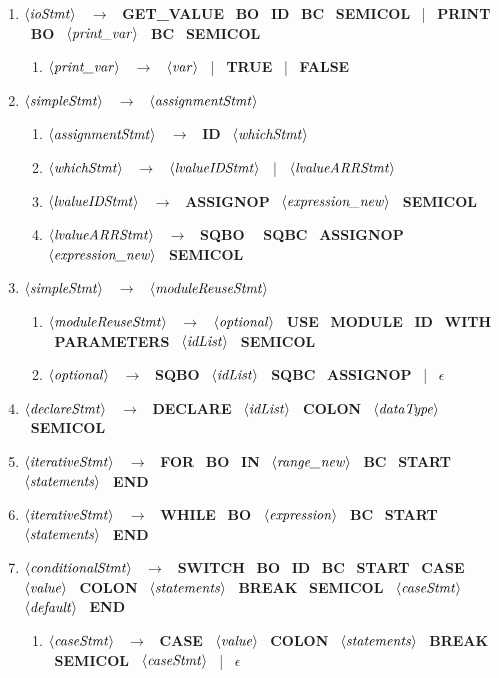 \documentclass[a4paper]{article}
\newcommand{\nonTerm}[1]{$\left<\text{\textit{#1}}\right>$ \ }
\newcommand{\terminal}[1]{\textbf{\uppercase{#1}} \ }
\newcommand{\ra}[0]{$\rightarrow$ \ }
\newcommand{\eps}[0]{\terminal{$\epsilon$}}
\newcommand{\vertbar}[0]{| \ }
\newcommand{\dataType}[0]{\nonTerm{dataType}}
\newcommand{\statements}[0]{\nonTerm{statements}}
\newcommand{\ioStmt}[0]{\nonTerm{ioStmt}}
\newcommand{\printvar}[0]{\nonTerm{print\_var}}
\newcommand{\simpleStmt}[0]{\nonTerm{simpleStmt}}
\newcommand{\declareStmt}[0]{\nonTerm{declareStmt}}
\newcommand{\conditionalStmt}[0]{\nonTerm{conditionalStmt}}
\newcommand{\iterativeStmt}[0]{\nonTerm{iterativeStmt}}
\newcommand{\var}[0]{\nonTerm{var}}
\newcommand{\assignmentStmt}[0]{\nonTerm{assignmentStmt}}
\newcommand{\moduleReuseStmt}[0]{\nonTerm{moduleReuseStmt}}
\newcommand{\whichStmt}[0]{\nonTerm{whichStmt}}
\newcommand{\lvalueIDStmt}[0]{\nonTerm{lvalueIDStmt}}
\newcommand{\lvalueARRStmt}[0]{\nonTerm{lvalueARRStmt}}
\newcommand{\expression}[0]{\nonTerm{expression}}
\newcommand{\expressionNew}[0]{\nonTerm{expression\_new}}
\newcommand{\rangeNew}[0]{\nonTerm{range\_new}}
\newcommand{\optional}[0]{\nonTerm{optional}}
\newcommand{\idList}[0]{\nonTerm{idList}}
\newcommand{\caseStmt}[0]{\nonTerm{caseStmt}}
\newcommand{\valueTerm}[0]{\nonTerm{value}}
\newcommand{\default}[0]{\nonTerm{default}}
\newcommand{\id}[0]{\terminal{id}}
\newcommand{\moduleTerm}[0]{\terminal{module}}
\newcommand{\start}[0]{\terminal{start}}
\renewcommand{\endTerm}[0]{\terminal{end}}
\newcommand{\declare}[0]{\terminal{declare}}
\newcommand{\getvalue}[0]{\terminal{get\_value}}
\newcommand{\print}[0]{\terminal{print}}
\newcommand{\use}[0]{\terminal{use}}
\newcommand{\with}[0]{\terminal{with}}
\newcommand{\true}[0]{\terminal{true}}
\newcommand{\false}[0]{\terminal{false}}
\newcommand{\for}[0]{\terminal{for}}
\newcommand{\inTerm}[0]{\terminal{in}}
\newcommand{\switch}[0]{\terminal{switch}}
\newcommand{\case}[0]{\terminal{case}}
\newcommand{\breakTerm}[0]{\terminal{break}}
\newcommand{\while}[0]{\terminal{while}}
\newcommand{\parameters}[0]{\terminal{parameters}}
\newcommand{\colonTerm}[0]{\terminal{colon}}
\newcommand{\semicol}[0]{\terminal{semicol}}
\newcommand{\assignop}[0]{\terminal{assignop}}
\newcommand{\sqbo}[0]{\terminal{sqbo}}
\newcommand{\sqbc}[0]{\terminal{sqbc}}
\newcommand{\bo}[0]{\terminal{bo}}
\newcommand{\bc}[0]{\terminal{bc}}
\begin{document}
\begin{enumerate}
    \begin{enumerate}
        \item \ioStmt \ra \getvalue \bo \id \bc \semicol \vertbar \print \bo \printvar \bc \semicol
        
        \begin{enumerate}
            \item \printvar \ra \var \vertbar \true \vertbar \false 
        \end{enumerate}
        
        \item \simpleStmt \ra \assignmentStmt
        \begin{enumerate}
            \item \assignmentStmt \ra \id \whichStmt
            \item \whichStmt \ra \lvalueIDStmt \vertbar \lvalueARRStmt
            \item \lvalueIDStmt \ra \assignop \expressionNew \semicol
            \item \lvalueARRStmt \ra \sqbo \ \sqbc \assignop \expressionNew \semicol
        \end{enumerate}
        
        
        \item \simpleStmt \ra \moduleReuseStmt
        \begin{enumerate}
            \item \moduleReuseStmt \ra \optional \use \moduleTerm \id \with \parameters \idList \semicol
            \item \optional \ra \sqbo \idList \sqbc \assignop \vertbar \eps
        \end{enumerate}
        
        \item \declareStmt \ra \declare \idList \colonTerm \dataType \semicol
        
        \item \iterativeStmt \ra \for \bo \inTerm \rangeNew \bc \start \statements \endTerm
        \item \iterativeStmt \ra \while \bo \expression \bc \start \statements \endTerm
        
        \item \conditionalStmt \ra \switch \bo \id \bc \start \case \valueTerm \colonTerm \statements \breakTerm \semicol \caseStmt \default \endTerm
        \begin{enumerate}
            \item \caseStmt \ra \case \valueTerm \colonTerm \statements \breakTerm \semicol \caseStmt \vertbar \eps
            

\end{enumerate}
\end{enumerate}
\end{enumerate}
\end{document}
